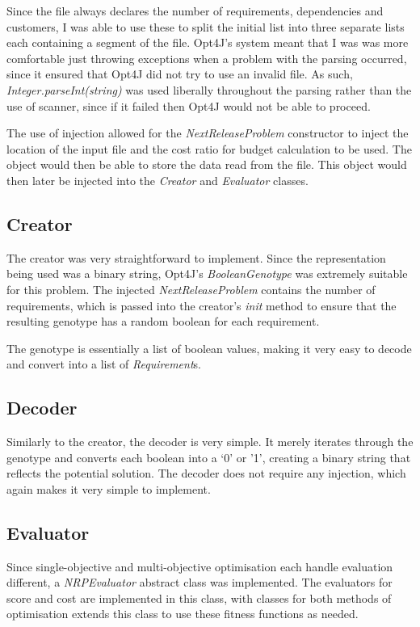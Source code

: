 \documentclass[11pt, a4paper]{article}
\begin{document}
Since the file always declares the number of requirements, dependencies and
customers, I was able to use these to split the initial list into three separate
lists each containing a segment of the file. Opt4J's system meant that I was
was more comfortable just throwing exceptions when a problem with the parsing
occurred, since it ensured that Opt4J did not try to use an invalid file. As
such, \emph{Integer.parseInt(string)} was used liberally throughout the parsing
rather than the use of scanner, since if it failed then Opt4J would not be able
to proceed.

The use of injection allowed for the \emph{NextReleaseProblem} constructor to
inject the location of the input file and the cost ratio for budget calculation
to be used. The object would then be able to store the data read from the file.
This object would then later be injected into the \emph{Creator} and
\emph{Evaluator} classes.

\subsection{Creator} %
\label{sub:creator}
The creator was very straightforward to implement. Since the representation
being used was a binary string, Opt4J's \emph{BooleanGenotype} was extremely
suitable for this problem. The injected \emph{NextReleaseProblem} contains the
number of requirements, which is passed into the creator's \emph{init} method to
ensure that the resulting genotype has a random boolean for each requirement.

The genotype is essentially a list of boolean values, making it very easy to
decode and convert into a list of \emph{Requirement}s.

\subsection{Decoder} %
\label{sub:decoder}
Similarly to the creator, the decoder is very simple. It merely iterates through
the genotype and converts each boolean into a `0' or '1', creating a binary
string that reflects the potential solution. The decoder does not require any
injection, which again makes it very simple to implement.

\subsection{Evaluator} %
\label{sub:evaluator}
Since single-objective and multi-objective optimisation each handle evaluation
different, a \emph{NRPEvaluator} abstract class was implemented. The evaluators
for score and cost are implemented in this class, with classes for both methods
of optimisation extends this class to use these fitness functions as needed.
\end{document}
